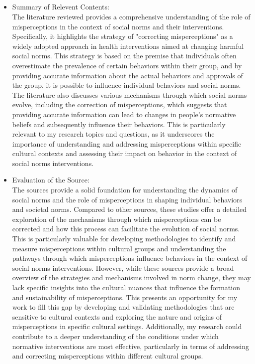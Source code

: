 \documentclass{article}
\begin{document}
\subsection{}
    \begin{itemize}
        \item Summary of Relevent Contents:\\ 
The literature reviewed provides a comprehensive understanding of the role of misperceptions in the context of social norms and their interventions. Specifically, it highlights the strategy of "correcting misperceptions" as a widely adopted approach in health interventions aimed at changing harmful social norms. This strategy is based on the premise that individuals often overestimate the prevalence of certain behaviors within their group, and by providing accurate information about the actual behaviors and approvals of the group, it is possible to influence individual behaviors and social norms. The literature also discusses various mechanisms through which social norms evolve, including the correction of misperceptions, which suggests that providing accurate information can lead to changes in people's normative beliefs and subsequently influence their behaviors. This is particularly relevant to my research topics and questions, as it underscores the importance of understanding and addressing misperceptions within specific cultural contexts and assessing their impact on behavior in the context of social norms interventions.
    \end{itemize}
    \begin{itemize}
        \item Evaluation of the Source:\\
The sources provide a solid foundation for understanding the dynamics of social norms and the role of misperceptions in shaping individual behaviors and societal norms. Compared to other sources, these studies offer a detailed exploration of the mechanisms through which misperceptions can be corrected and how this process can facilitate the evolution of social norms. This is particularly valuable for developing methodologies to identify and measure misperceptions within cultural groups and understanding the pathways through which misperceptions influence behaviors in the context of social norms interventions.
However, while these sources provide a broad overview of the strategies and mechanisms involved in norm change, they may lack specific insights into the cultural nuances that influence the formation and sustainability of misperceptions. This presents an opportunity for my work to fill this gap by developing and validating methodologies that are sensitive to cultural contexts and exploring the nature and origins of misperceptions in specific cultural settings. Additionally, my research could contribute to a deeper understanding of the conditions under which normative interventions are most effective, particularly in terms of addressing and correcting misperceptions within different cultural groups.
    \end{itemize}
\end{document}
